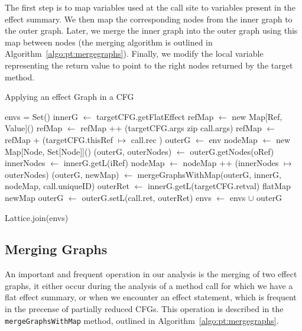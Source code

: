 \documentclass[a4paper]{article}
\begin{document}
The first step is to map variables used at the call site to variables present
in the effect summary. We then map the corresponding nodes from the inner graph
to the outer graph. Later, we merge the inner graph into the outer graph using this
map between nodes (the merging algorithm is outlined in
Algorithm~\ref{algo:pt:mergegraphs}). Finally, we modify the local variable
representing the return value to point to the right nodes returned by the
target method.


\begin{algorithm}
\caption{Applying an effect Graph in a CFG}\label{algo:pt:applyeffects}
\begin{algorithmic}[1]
    \State envs = Set()
        \State innerG $\gets$ targetCFG.getFlatEffect
        \State refMap $\gets$ new Map[Ref, Value]()
        \State refMap $\gets$ refMap ++ (targetCFG.args zip call.args)
        \State refMap $\gets$ refMap + (targetCFG.thisRef $\mapsto$ call.rec )
        \State
        \State outerG $\gets$ env
        \State nodeMap $\gets$ new Map[Node, Set[Node]]()
            \State (outerG, outerNodes) $\gets$ outerG.getNodes(oRef)
            \State innerNodes $\gets$ innerG.getL(iRef)
            \State nodeMap $\gets$ nodeMap ++ (innerNodes $\mapsto$ outerNodes)
        \EndFor
        \State
        \State (outerG, newMap) $\gets$ mergeGraphsWithMap(outerG, innerG, nodeMap, call.uniqueID)
        \State
        \State outerRet $\gets$ innerG.getL(targetCFG.retval) flatMap newMap
        \State outerG $\gets$ outerG.setL(call.ret, outerRet)
        \State
        \State envs $\gets$ envs $\cup$ outerG
    \EndFor

    \State \Return Lattice.join(envs)
\EndFunction
\end{algorithmic}
\end{algorithm}

\FloatBarrier

\subsection{Merging Graphs}
An important and frequent operation in our analysis is the merging of two effect
graphs, it either occur during the analysis of a method call for which we have
a flat effect summary, or when we encounter an effect statement, which is
frequent in the precense of partially reduced CFGs. This operation is described
in the \verb=mergeGraphsWithMap= method, outlined in
Algorithm~\ref{algo:pt:mergegraphs}.
\end{document}
